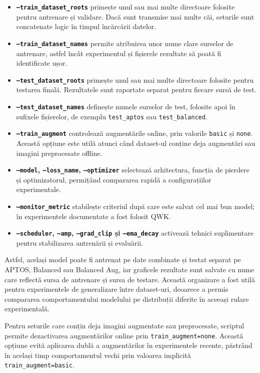 \documentclass[12pt, a4paper, twoside, romanian]{teza-upb}
\begin{document}
\begin{itemize}
  \item \textbf{\texttt{--train\_dataset\_roots}} primește unul sau mai multe directoare folosite pentru antrenare și validare. Dacă sunt transmise mai multe căi, seturile sunt concatenate logic în timpul încărcării datelor.
  \item \textbf{\texttt{--train\_dataset\_names}} permite atribuirea unor nume clare surselor de antrenare, astfel încât experimentul și fișierele rezultate să poată fi identificate ușor.
  \item \textbf{\texttt{--test\_dataset\_roots}} primește unul sau mai multe directoare folosite pentru testarea finală. Rezultatele sunt raportate separat pentru fiecare sursă de test.
  \item \textbf{\texttt{--test\_dataset\_names}} definește numele surselor de test, folosite apoi în sufixele fișierelor, de exemplu \texttt{test\_aptos} sau \texttt{test\_balanced}.
  \item \textbf{\texttt{--train\_augment}} controlează augmentările online, prin valorile \texttt{basic} și \texttt{none}. Această opțiune este utilă atunci când dataset-ul conține deja augmentări sau imagini preprocesate offline.
  \item \textbf{\texttt{--model}, \texttt{--loss\_name}, \texttt{--optimizer}} selectează arhitectura, funcția de pierdere și optimizatorul, permițând compararea rapidă a configurațiilor experimentale.
  \item \textbf{\texttt{--monitor\_metric}} stabilește criteriul după care este salvat cel mai bun model; în experimentele documentate a fost folosit QWK.
  \item \textbf{\texttt{--scheduler}, \texttt{--amp}, \texttt{--grad\_clip} și \texttt{--ema\_decay}} activează tehnici suplimentare pentru stabilizarea antrenării și evaluării.
\end{itemize}
\bigskip

Astfel, același model poate fi antrenat pe date combinate și testat separat pe APTOS, Balanced
sau Balanced Aug, iar graficele rezultate sunt salvate cu nume care reflectă sursa de antrenare
și sursa de testare. Această organizare a fost utilă pentru experimentele de generalizare între
dataset-uri, deoarece a permis compararea comportamentului modelului pe distribuții diferite în
aceeași rulare experimentală.
\bigskip

Pentru seturile care conțin deja imagini augmentate sau preprocesate, scriptul permite
dezactivarea augmentărilor online prin \texttt{train\_augment=none}. Această opțiune evită aplicarea dublă
a augmentărilor în experimentele recente, păstrând în același timp comportamentul vechi prin
valoarea implicită \texttt{train\_augment=basic}.
\end{document}
